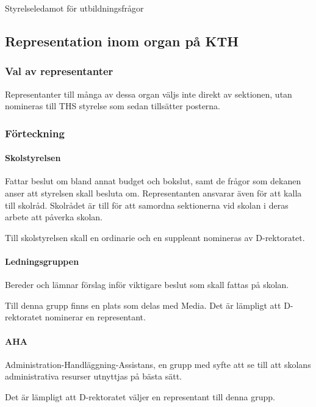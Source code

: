 \documentclass[a4paper,12pt]{article}
\begin{document}
Styrelseledamot för utbildningsfrågor

\subsection{Representation inom organ på KTH}

\subsubsection{Val av representanter}

Representanter till många av dessa organ väljs inte direkt av sektionen, utan nomineras till THS styrelse som sedan tillsätter posterna.

\subsubsection{Förteckning}

\paragraph{Skolstyrelsen}

Fattar beslut om bland annat budget och bokslut, samt de frågor som dekanen anser att styrelsen skall besluta om. Representanten ansvarar även för att kalla till skolråd. Skolrådet är till för att samordna sektionerna vid skolan i deras arbete att påverka skolan.

Till skolstyrelsen skall en ordinarie och en suppleant nomineras av D-rektoratet.

\paragraph{Ledningsgruppen}

Bereder och lämnar förslag inför viktigare beslut som skall fattas på skolan.

Till denna grupp finns en plats som delas med Media. Det är lämpligt att D-rektoratet nominerar en representant.

\paragraph{AHA}

Administration-Handläggning-Assistans, en grupp med syfte att se till att skolans administrativa resurser utnyttjas på bästa sätt.

Det är lämpligt att D-rektoratet väljer en representant till denna grupp.
\end{document}
